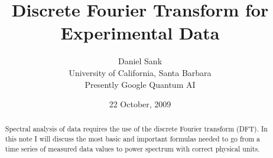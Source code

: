 \documentclass[twocolumn]{article}
\title{Discrete Fourier Transform for Experimental Data}
\author{Daniel Sank\\\small{University of California, Santa Barbara}\\\small{Presently Google Quantum AI}}
\date{22 October, 2009}
\begin{document}
\maketitle

\begin{abstract}
Spectral analysis of data requires the use of the discrete Fourier
transform (DFT). In this note I will discuss the most basic and important
formulas needed to go from a time series of measured data values to
power spectrum with correct physical units. 
\end{abstract}



\end{document}
